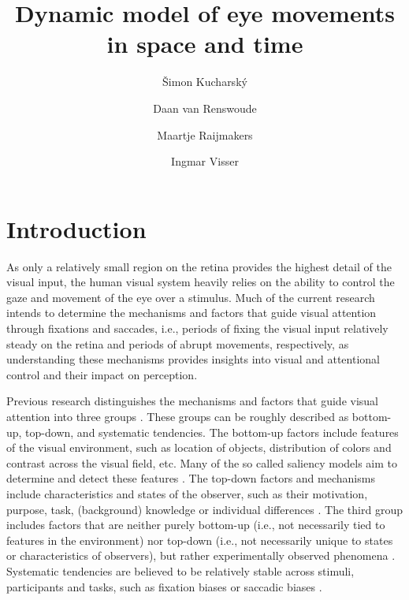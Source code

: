 \documentclass{article}
\begin{document}
\title{Dynamic model of eye movements in space and time}

\author[1]{Šimon Kucharský}
\author[2]{Daan van Renswoude}
\author[1,3]{Maartje Raijmakers}
\author[1]{Ingmar Visser}
\date{}
\doublespacing
\clearpage\maketitle
\section{Introduction}

As only a relatively small region on the retina provides the highest detail of the visual input, the human visual system heavily relies on the ability to control the gaze and movement of the eye over a stimulus. Much of the current research intends to determine the mechanisms and factors that guide visual attention through fixations and saccades, i.e., periods of fixing the visual input relatively steady on the retina and periods of abrupt movements, respectively, as understanding these mechanisms provides insights into visual and attentional control and their impact on perception.


Previous research distinguishes the mechanisms and factors that guide visual attention into three groups \citep{itti2015computational,schutt2017likelihood,tatler2008systematic}. These groups can be roughly described as bottom-up, top-down, and systematic tendencies. The bottom-up factors include features of the visual environment, such as location of objects, distribution of colors and contrast across the visual field, etc. Many of the so called saliency models aim to determine and detect these features \citep{itti2001computational,tatler2011salience,xu2014beyond}. The top-down factors and mechanisms include characteristics and states of the observer, such as their motivation, purpose, task, (background) knowledge or individual differences \citep{de2019individual}. The third group includes factors that are neither purely bottom-up (i.e., not necessarily tied to features in the environment) nor top-down (i.e., not necessarily unique to states or characteristics of observers), but rather experimentally observed phenomena \citep{tatler2008systematic}. Systematic tendencies are believed to be relatively stable across stimuli, participants and tasks, such as fixation biases \citep[e.g., central bias; ][]{tatler2007central,renswoude2019central} or saccadic biases \citep[e.g., horizontal bias; ][]{le_meur2015saccadic,renswoude2016horizontal}.
\end{document}
